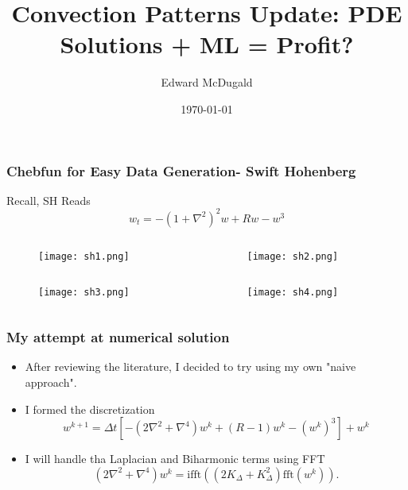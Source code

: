 \documentclass[]{beamer}
\title{Convection Patterns Update: PDE Solutions + ML = Profit?}
\author{Edward McDugald}
\institute{University of Arizona}
\date{\today}
\begin{document}
\begin{frame}
  \titlepage
\end{frame}

\begin{frame}
    \frametitle{Chebfun for Easy Data Generation- Swift Hohenberg}
    Recall, SH Reads
    \[w_t = -(1+\nabla^2)^2w + Rw - w^3\]
    \begin{columns}[c]
    \begin{column}{.5\textwidth}
        \begin{figure}
        \centering
        \texttt{[image: sh1.png]}
        \end{figure}
    \end{column}
    \begin{column}{.5\textwidth}
        \begin{figure}
        \centering
        \texttt{[image: sh2.png]}
        \end{figure}
    \end{column}
    \end{columns}
        \begin{columns}[c]
    \begin{column}{.5\textwidth}
        \begin{figure}
        \centering
        \texttt{[image: sh3.png]}
        \end{figure}
    \end{column}
    \begin{column}{.5\textwidth}
        \begin{figure}
        \centering
        \texttt{[image: sh4.png]}
        \end{figure}
    \end{column}
    \end{columns}
\end{frame}

\begin{frame}
    \frametitle{My attempt at numerical solution}
    \begin{itemize}
        \item After reviewing the literature, I decided to try using my own "naive approach".
        \item I formed the discretization
            \[
            w^{k+1} = \Delta t \left[ -(2\nabla^2+\nabla^4)w^k + (R-1)w^k-(w^k)^3\right]+w^k
            \] 
        \item I will handle tha Laplacian and Biharmonic terms using FFT
            \[
                (2\nabla^2+\nabla^4)w^{k} = \text{ifft}((2K_{\Delta}+K_{\Delta}^2)\text{fft}(w^{k})).
            \] 
    \end{itemize}
\end{frame}
\end{document}
